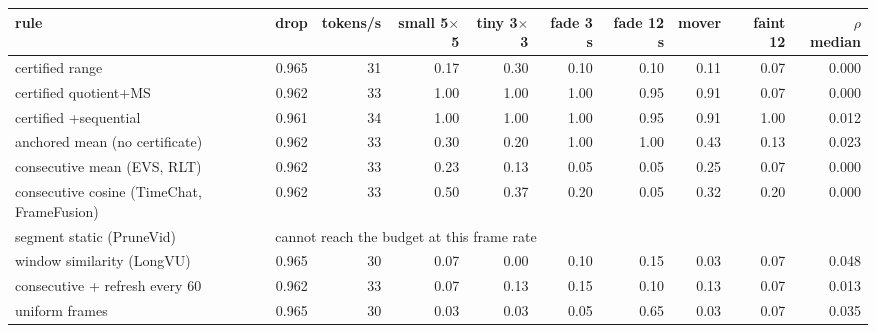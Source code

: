 \begin{tabular}{lrrrrrrrrr}
\toprule
rule & drop & tokens/s & small 5$\times$5 & tiny 3$\times$3 & fade 3 s & fade 12 s & mover & faint 12 & $\rho$ median \\
\midrule
certified range & 0.965 & 31 & 0.17 & 0.30 & 0.10 & 0.10 & 0.11 & 0.07 & 0.000 \\
certified quotient+MS & 0.962 & 33 & 1.00 & 1.00 & 1.00 & 0.95 & 0.91 & 0.07 & 0.000 \\
certified +sequential & 0.961 & 34 & 1.00 & 1.00 & 1.00 & 0.95 & 0.91 & 1.00 & 0.012 \\
anchored mean (no certificate) & 0.962 & 33 & 0.30 & 0.20 & 1.00 & 1.00 & 0.43 & 0.13 & 0.023 \\
consecutive mean (EVS, RLT) & 0.962 & 33 & 0.23 & 0.13 & 0.05 & 0.05 & 0.25 & 0.07 & 0.000 \\
consecutive cosine (TimeChat, FrameFusion) & 0.962 & 33 & 0.50 & 0.37 & 0.20 & 0.05 & 0.32 & 0.20 & 0.000 \\
segment static (PruneVid) & \multicolumn{9}{l}{cannot reach the budget at this frame rate} \\
window similarity (LongVU) & 0.965 & 30 & 0.07 & 0.00 & 0.10 & 0.15 & 0.03 & 0.07 & 0.048 \\
consecutive + refresh every 60 & 0.962 & 33 & 0.07 & 0.13 & 0.15 & 0.10 & 0.13 & 0.07 & 0.013 \\
uniform frames & 0.965 & 30 & 0.03 & 0.03 & 0.05 & 0.65 & 0.03 & 0.07 & 0.035 \\
\bottomrule
\end{tabular}
